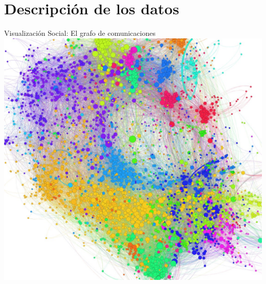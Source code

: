 \documentclass[xcolor=x11names]{beamer}
\begin{document}
\section{ Descripción de los datos}

\begin{frame}{Visualización Social: El grafo de comunicaciones}
		\center\
		\includegraphics[scale=0.24]{slides/Graph-screenshot.jpg}
\end{frame}
\end{document}
